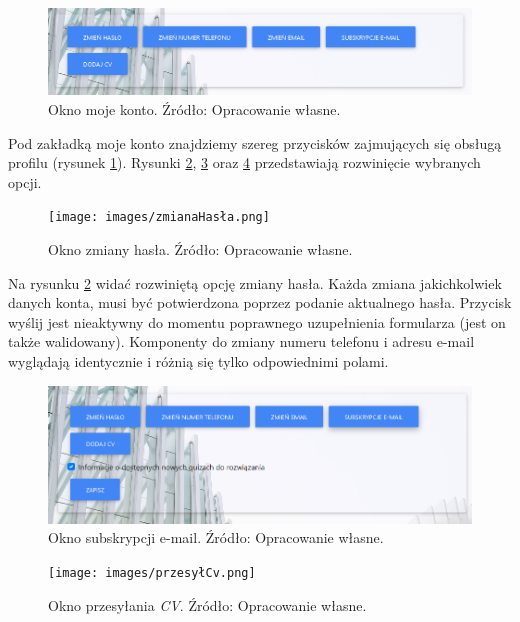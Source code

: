 \documentclass[twoside]{projektInzynierskiMS}
\numberwithin{figure}{section}
\begin{document}
\begin{figure}[h!]
    \centering
    \includegraphics[width = \textwidth]{images/mojeKonto.png}
    \caption{Okno moje konto. Źródło: Opracowanie własne.}
    \label{fig:okno_moje_konto}
\end{figure}

Pod zakładką moje konto znajdziemy szereg przycisków zajmujących się obsługą profilu (rysunek \ref{fig:okno_moje_konto}). Rysunki \ref{fig:okno_zmiany_hasła}, \ref{fig:okno_subskrypcji_email} oraz \ref{fig:okno_przesyłania_cv} przedstawiają rozwinięcie wybranych opcji.

\newpage

\begin{figure}[h!]
    \centering
    \texttt{[image: images/zmianaHasła.png]}
    \caption{Okno zmiany hasła. Źródło: Opracowanie własne.}
    \label{fig:okno_zmiany_hasła}
\end{figure}

Na rysunku \ref{fig:okno_zmiany_hasła} widać rozwiniętą opcję zmiany hasła. Każda zmiana jakichkolwiek danych konta, musi być potwierdzona poprzez podanie aktualnego hasła. Przycisk wyślij jest nieaktywny do momentu poprawnego uzupełnienia formularza (jest on także walidowany). Komponenty do zmiany numeru telefonu i adresu e-mail wyglądają identycznie i różnią się tylko odpowiednimi polami. 

\begin{figure}[h!]
    \centering
    \includegraphics[width = \textwidth]{images/subskrypcjaEmail.png}
    \caption{Okno subskrypcji e-mail. Źródło: Opracowanie własne.}
    \label{fig:okno_subskrypcji_email}
\end{figure}

\newpage

\begin{figure}[h!]
    \centering
    \texttt{[image: images/przesyłCv.png]}
    \caption{Okno przesyłania \textit{CV}. Źródło: Opracowanie własne.}
    \label{fig:okno_przesyłania_cv}
\end{figure}
\end{document}
